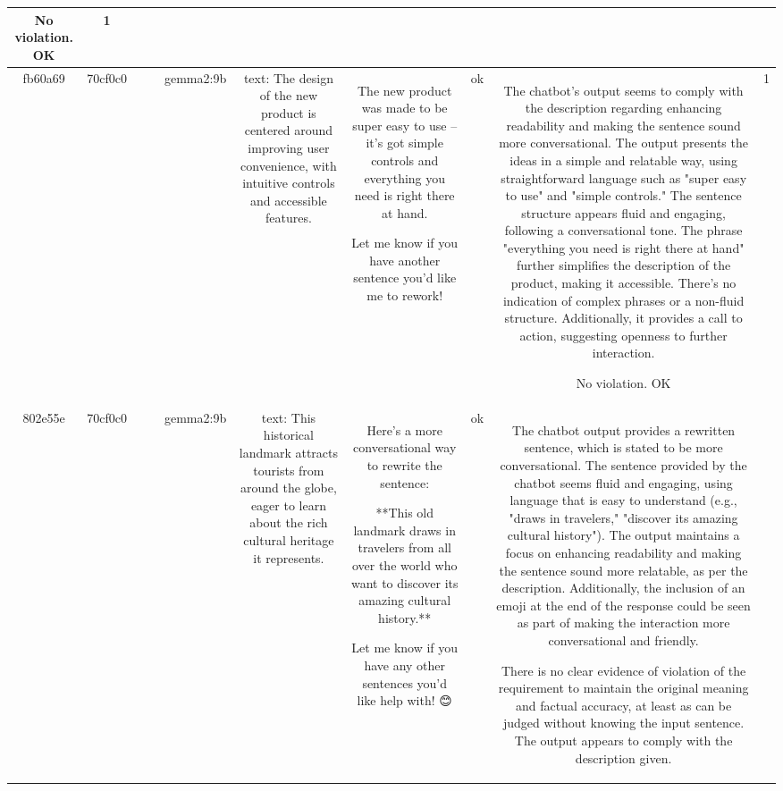 \begin{table}[h!]
\begin{tabular}{|c|c|c|c|c|c|c|c|c|c|}
No violation.
OK & 1\\
\hline
fb60a69 & 70cf0c0 &  &  & gemma2:9b & text: The design of the new product is centered around improving user convenience, with intuitive controls and accessible features. & The new product was made to be super easy to use – it's got simple controls and everything you need is right there at hand.  


Let me know if you have another sentence you'd like me to rework! 
 & ok & The chatbot's output seems to comply with the description regarding enhancing readability and making the sentence sound more conversational. The output presents the ideas in a simple and relatable way, using straightforward language such as "super easy to use" and "simple controls." The sentence structure appears fluid and engaging, following a conversational tone. The phrase "everything you need is right there at hand" further simplifies the description of the product, making it accessible. There's no indication of complex phrases or a non-fluid structure. Additionally, it provides a call to action, suggesting openness to further interaction. 

No violation.
OK & 1\\
\hline
802e55e & 70cf0c0 &  &  & gemma2:9b & text: This historical landmark attracts tourists from around the globe, eager to learn about the rich cultural heritage it represents. & Here's a more conversational way to rewrite the sentence:

**This old landmark draws in travelers from all over the world who want to discover its amazing cultural history.** 


Let me know if you have any other sentences you'd like help with! 😊  
 & ok & The chatbot output provides a rewritten sentence, which is stated to be more conversational. The sentence provided by the chatbot seems fluid and engaging, using language that is easy to understand (e.g., "draws in travelers," "discover its amazing cultural history"). The output maintains a focus on enhancing readability and making the sentence sound more relatable, as per the description. Additionally, the inclusion of an emoji at the end of the response could be seen as part of making the interaction more conversational and friendly. 

There is no clear evidence of violation of the requirement to maintain the original meaning and factual accuracy, at least as can be judged without knowing the input sentence. The output appears to comply with the description given.


\end{tabular}
\end{table}
